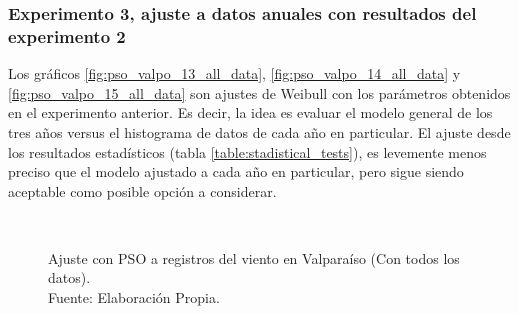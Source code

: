\subsubsection{Experimento 3, ajuste a datos anuales con resultados del experimento 2}
Los gráficos \ref{fig:pso_valpo_13_all_data}, \ref{fig:pso_valpo_14_all_data} y \ref{fig:pso_valpo_15_all_data} son ajustes de Weibull con los parámetros obtenidos en el experimento anterior. Es decir, la idea es evaluar el modelo general de los tres años versus el histograma de datos de cada año en particular.
El ajuste desde los resultados estadísticos (tabla \ref{table:stadistical_tests}), es levemente menos preciso que el modelo ajustado a cada año en particular, pero sigue siendo aceptable como posible opción a considerar.
\begin{figure}[ht!]
    \centering
    \\   

    \caption{Ajuste con PSO a registros del viento en Valparaíso (Con todos los datos).\\ Fuente: Elaboración Propia.}
    \label{fig:subfigures}
\end{figure}


